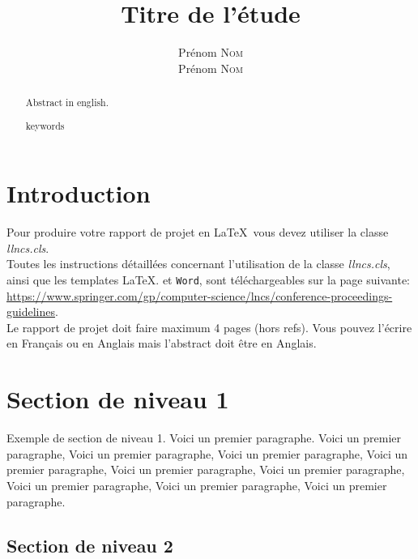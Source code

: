 \documentclass[french]{../cls/llncs}
\title{Titre de l'étude}
\author{ Prénom \textsc{Nom} \\
         Prénom \textsc{Nom} }
\institute{Université Claude Bernard Lyon 1, France}
\begin{document}
    \renewcommand{\thelstlisting}{\arabic{lstlisting}}

    \maketitle   
    
    \begin{abstract}
        Abstract in english.
        
         \begin{keywords}
        keywords
    \end{keywords}
    \end{abstract}


   


    \section{Introduction} \label{intro}

Pour produire votre rapport de projet en \LaTeX\, vous devez utiliser la
classe \textit{llncs.cls}. \\
        
        Toutes les instructions détaillées concernant l'utilisation de la classe \textit{llncs.cls}, ainsi que les templates \LaTeX. et \texttt{Word}, sont téléchargeables sur la page suivante:\\ \url{https://www.springer.com/gp/computer-science/lncs/conference-proceedings-guidelines}.\\
        
     Le rapport de projet doit faire maximum 4 pages (hors refs). Vous pouvez l'écrire en Français ou en Anglais mais l'abstract doit être en Anglais.
      
      
    \section{Section de niveau 1} \label{sect:niveau11}

Exemple de section de niveau 1.  Voici un premier paragraphe. Voici
un premier paragraphe, Voici un premier paragraphe, Voici un premier
paragraphe, Voici un premier paragraphe, Voici un premier
paragraphe, Voici un premier paragraphe, Voici un premier
paragraphe, Voici un premier paragraphe, Voici un premier
paragraphe.

       

        \subsection{Section de niveau 2} \label{sect:niveau2}
\end{document}

